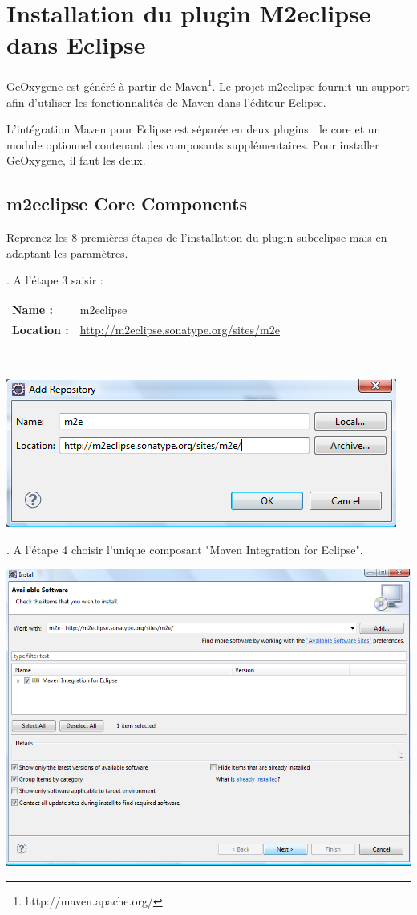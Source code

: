 % 

\section{Installation du plugin M2eclipse dans Eclipse}

GeOxygene est généré à partir de Maven\footnote{http://maven.apache.org/}.  Le projet m2eclipse fournit un support afin d'utiliser les fonctionnalités de Maven dans l'éditeur Eclipse.

\medskip

\noindent
L'intégration Maven pour Eclipse est séparée en deux plugins : le core et un module optionnel contenant des composants supplémentaires. Pour installer GeOxygene, il faut les deux.


\subsection{m2eclipse Core Components}
Reprenez les 8 premières étapes de l'installation du plugin subeclipse mais en adaptant les paramètres.

\medskip

. A l'étape 3 saisir :\\

\begin{tabular}[!t]{ll}
{\bf Name : }&{m2eclipse}\\
{\bf Location : }&{\href{http://m2eclipse.sonatype.org/sites/m2e}{http://m2eclipse.sonatype.org/sites/m2e}}\\
\end{tabular}\\

\smallskip
\begin{center}
\includegraphics[width=0.4\linewidth]{../../resources/images/guide_installation/m2eclipseUrl.png}
\end{center}

. A l'étape 4 choisir l'unique composant "Maven Integration for Eclipse".\\
\begin{center}
\includegraphics[width=0.4\linewidth]{../../resources/images/guide_installation/m2eclipseEtape1.png}
\end{center}

